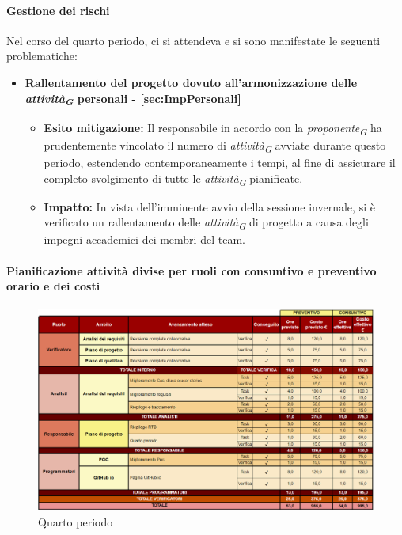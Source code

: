 \paragraph{Gestione dei rischi} 
Nel corso del quarto periodo, ci si attendeva e si sono manifestate le seguenti problematiche:
\begin{itemize}
    \item \textbf{Rallentamento del progetto dovuto all’armonizzazione delle \textit{attività}\textsubscript{\textit{G}} personali - \ref{sec:ImpPersonali}}
    \begin{itemize}
        \item \textbf{Esito mitigazione:} 
        Il responsabile in accordo con la \textit{proponente}\textsubscript{\textit{G}} ha prudentemente vincolato il numero di \textit{attività}\textsubscript{\textit{G}} avviate durante questo periodo, estendendo contemporaneamente i tempi, al fine di assicurare il completo svolgimento di tutte le \textit{attività}\textsubscript{\textit{G}} pianificate.
        \item \textbf{Impatto:}
        In vista dell'imminente avvio della sessione invernale, si è verificato un rallentamento delle \textit{attività}\textsubscript{\textit{G}} di progetto a causa degli impegni accademici dei membri del team.
        \end{itemize}
\end{itemize}

\newpage
\paragraph{Pianificazione attività divise per ruoli con consuntivo e preventivo orario e dei costi}\hspace{1pt}

\begin{figure}[H]
    \centering
    \includegraphics[width=\linewidth, height=0.9\textheight, keepaspectratio]{../Images/periodo4.PNG}
    \caption{Quarto periodo}
    \label{fig:Quarto_periodo}
\end{figure}


